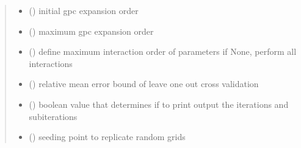 \documentclass[letterpaper,10pt,english,openany,oneside]{sphinxmanual}
\begin{document}
\begin{fulllineitems}
\begin{quote}
\begin{description}
\begin{itemize}
\item {} 
 (\sphinxstyleliteralemphasis{\sphinxupquote{, }}\sphinxstyleliteralemphasis{\sphinxupquote{, }}) \textendash{} initial gpc expansion order

\item {} 
 (\sphinxstyleliteralemphasis{\sphinxupquote{, }}\sphinxstyleliteralemphasis{\sphinxupquote{, }}) \textendash{} maximum gpc expansion order

\item {} 
 (\sphinxstyleliteralemphasis{\sphinxupquote{, }}\sphinxstyleliteralemphasis{\sphinxupquote{, }}) \textendash{} define maximum interaction order of parameters
if None, perform all interactions

\item {} 
 (\sphinxstyleliteralemphasis{\sphinxupquote{, }}\sphinxstyleliteralemphasis{\sphinxupquote{, }}) \textendash{} relative mean error bound of leave one out cross validation

\item {} 
 (\sphinxstyleliteralemphasis{\sphinxupquote{, }}\sphinxstyleliteralemphasis{\sphinxupquote{, }}) \textendash{} boolean value that determines if to print output the iterations and subiterations

\item {} 
 (\sphinxstyleliteralemphasis{\sphinxupquote{, }}\sphinxstyleliteralemphasis{\sphinxupquote{, }}) \textendash{} seeding point to replicate random grids


\end{itemize}
\end{description}
\end{quote}
\end{fulllineitems}
\end{document}
